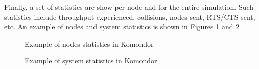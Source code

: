 \documentclass[a4paper]{article}
\begin{document}
		Finally, a set of statistics are show per node and for the entire simulation. Such statistics include throughput experienced, collisions, nodes sent, RTS/CTS sent, etc. An example of nodes and system statistics is shown in Figures \ref{fig:nodes_statistics_example} and \ref{fig:general_statistics_example}
		\begin{figure}[h!]
			\centering
			\caption{Example of nodes statistics in Komondor}
			\label{fig:nodes_statistics_example}
		\end{figure}
		
		\begin{figure}[h!]
			\centering
			\caption{Example of system statistics in Komondor}
			\label{fig:general_statistics_example}
		\end{figure}
	
\end{document}
